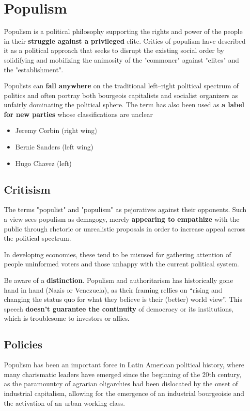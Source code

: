 
\section{Populism}

Populism is a political philosophy supporting the rights and power of the people in their \textbf{struggle against a privileged} elite. Critics of populism have described it as a political approach that seeks to disrupt the existing social order by solidifying and mobilizing the animosity of the "commoner" against "elites" and the "establishment".

Populists can \textbf{fall anywhere} on the traditional left–right political spectrum of politics and often portray both bourgeois capitalists and socialist organizers as unfairly dominating the political sphere. The term has also been used as \textbf{a label for new parties} whose classifications are unclear
\begin{itemize}
	\item Jeremy Corbin (right wing)
	\item Bernie Sanders (left wing)
	\item Hugo Chavez (left)
\end{itemize}



\subsection{Critisism}

The terms "populist" and "populism" as pejoratives against their opponents. Such a view sees populism as demagogy, merely \textbf{appearing to empathize} with the public through rhetoric or unrealistic proposals in order to increase appeal across the political spectrum.

In developing economies, these tend to be misused for gathering attention of people uninformed voters and those unhappy with the current political system.

Be aware of a \textbf{distinction}. Populism and authoritarism has historically gone hand in hand (Nazis or Venezuela), as their framing rellies on ``rising and changing the status quo for what they believe is their (better) world view''. This speech \textbf{doesn't guarantee the continuity} of democracy or its institutions, which is troublesome to investors or allies.

\subsection{Policies} 
Populism has been an important force in Latin American political history, where many charismatic leaders have emerged since the beginning of the 20th century, as the paramountcy of agrarian oligarchies had been dislocated by the onset of industrial capitalism, allowing for the emergence of an industrial bourgeoisie and the activation of an urban working class.

